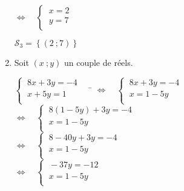 \documentclass[a4paper,11pt,exos]{nsi} %
\begin{document}
\begin{enumerate}
\begin{tabbing}
                \>  $\iff\quad \left\{
                    \begin{array}{l}
                    \ x=2 \\
                    \ y=7\\
                \end{array} \right.$
            \end{tabbing}
        $\mathcal{S}_3=\left\{(2\ ;7)\right\}$

        \item Soit $(x\ ;y)$ un couple de réels.
        \begin{tabbing}
            $\left\{
                \begin{array}{l}
                    \ 8x+3y=-4 \\
                    \ x+5y=1\\
                \end{array} \right. \quad$  \= $\iff\quad 
                \left\{
                    \begin{array}{l}
                    \ 8x+3y=-4 \\
                    \ x=1-5y\\
                \end{array} \right.$\\[.5em]
    
                \>  $\iff\quad \left\{
                    \begin{array}{l}
                    \ 8(1-5y)+3y=-4 \\
                    \ x=1-5y\\
                \end{array} \right.$\\[.5em]

                \>  $\iff\quad \left\{
                    \begin{array}{l}
                    \ 8-40y+3y=-4 \\
                    \ x=1-5y\\
                \end{array} \right.$\\[.5em]

                \>  $\iff\quad \left\{
                    \begin{array}{l}
                    \ -37y=-12 \\
                    \ x=1-5y\\
                \end{array} \right.$\\[.5em]


\end{tabbing}
\end{enumerate}
\end{document}
